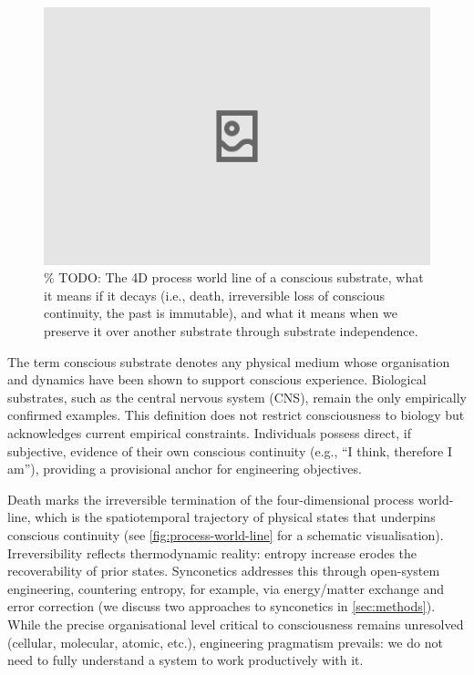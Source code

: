 \documentclass[10pt]{article}
\begin{document}
\begin{sloppypar}
  \begin{figure}[ht!]
    \centering
    \includegraphics[width=\textwidth]{figures/4D-process-world-line-ending.png}
    \caption{\% TODO: The 4D process world line of a conscious substrate, what it means if it decays (i.e., death, irreversible loss of conscious continuity, the past is immutable), and what it means when we preserve it over another substrate through substrate independence.}
    \label{fig:process-world-line-ending}
  \end{figure}

  The term conscious substrate denotes any physical medium whose organisation and dynamics have been shown to support conscious experience. Biological substrates, such as the central nervous system (CNS), remain the only empirically confirmed examples. This definition does not restrict consciousness to biology but acknowledges current empirical constraints. Individuals possess direct, if subjective, evidence of their own conscious continuity (e.g., “I think, therefore I am”), providing a provisional anchor for engineering objectives.

  Death marks the irreversible termination of the four-dimensional process world-line, which is the spatiotemporal trajectory of physical states that underpins conscious continuity (see \autoref{fig:process-world-line} for a schematic visualisation). Irreversibility reflects thermodynamic reality: entropy increase erodes the recoverability of prior states. Synconetics addresses this through open-system engineering, countering entropy, for example, via energy/matter exchange and error correction (we discuss two approaches to synconetics in \autoref{sec:methods}). While the precise organisational level critical to consciousness remains unresolved (cellular, molecular, atomic, etc.), engineering pragmatism prevails: we do not need to fully understand a system to work productively with it.


\end{sloppypar}
\end{document}
